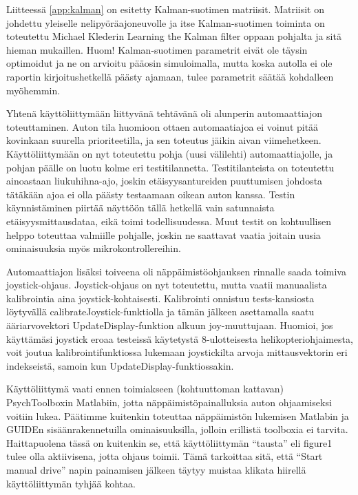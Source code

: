 \documentclass{article}
\begin{document}
Liitteessä \ref{app:kalman} on esitetty Kalman-suotimen matriisit. Matriisit on johdettu yleiselle nelipyöräajoneuvolle ja itse Kalman-suotimen toiminta on toteutettu Michael Klederin Learning the Kalman filter \cite{bib:kalman} oppaan pohjalta ja sitä hieman mukaillen. Huom! Kalman-suotimen parametrit eivät ole täysin optimoidut ja ne on arvioitu pääosin simuloimalla, mutta koska autolla ei ole raportin kirjoitushetkellä päästy ajamaan, tulee parametrit säätää kohdalleen myöhemmin.

Yhtenä käyttöliittymään liittyvänä tehtävänä oli alunperin automaattiajon toteuttaminen. Auton tila huomioon ottaen automaatiajoa ei voinut pitää kovinkaan suurella prioriteetilla, ja sen toteutus jäikin aivan viimehetkeen. Käyttöliittymään on nyt toteutettu pohja (uusi välilehti) automaattiajolle, ja pohjan päälle on luotu kolme eri testitilannetta. Testitilanteista on toteutettu ainoastaan liukuhihna-ajo, joskin etäisyysantureiden puuttumisen johdosta tätäkään ajoa ei olla päästy testaamaan oikean auton kanssa. Testin käynnistäminen piirtää näyttöön tällä hetkellä vain satunnaista etäisyysmittausdataa, eikä toimi todellisuudessa. Muut testit on kohtuullisen helppo toteuttaa valmiille pohjalle, joskin ne saattavat vaatia joitain uusia ominaisuuksia myös mikrokontrollereihin.

Automaattiajon lisäksi toiveena oli näppäimistöohjauksen rinnalle saada toimiva joystick-ohjaus. Joystick-ohjaus on nyt toteutettu, mutta vaatii manuaalista kalibrointia aina joystick-kohtaisesti. Kalibrointi onnistuu tests-kansiosta löytyvällä calibrateJoystick-funktiolla ja tämän jälkeen asettamalla saatu ääriarvovektori UpdateDisplay-funktion alkuun joy-muuttujaan. Huomioi, jos käyttämäsi joystick eroaa testeissä käytetystä 8-ulotteisesta helikopteriohjaimesta, voit joutua kalibrointifunktiossa lukemaan joystickilta arvoja mittausvektorin eri indekseistä, samoin kun UpdateDisplay-funktiossakin.

Käyttöliittymä vaati ennen toimiakseen (kohtuuttoman kattavan) PsychToolboxin Matlabiin, jotta näppäimistöpainalluksia auton ohjaamiseksi voitiin lukea. Päätimme kuitenkin toteuttaa näppäimistön lukemisen Matlabin ja GUIDEn sisäänrakennetuilla ominaisuuksilla, jolloin erillistä toolboxia ei tarvita. Haittapuolena tässä on kuitenkin se, että käyttöliittymän ``tausta'' eli figure1 tulee olla aktiivisena, jotta ohjaus toimii. Tämä tarkoittaa sitä, että ``Start manual drive'' napin painamisen jälkeen täytyy muistaa klikata hiirellä käyttöliittymän tyhjää kohtaa.
\end{document}
